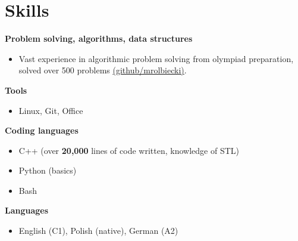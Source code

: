 \renewcommand{\subsection}[1]{
    \noindent\textbf{#1}
}
\section{Skills}
\subsection{Problem solving, algorithms, data structures}{}{}
\begin{itemize}
    \item Vast experience in algorithmic problem solving from olympiad preparation, solved over 500 problems \href{https://github.com/mrolbiecki/}{(github/mrolbiecki)}.

\end{itemize}

\subsection{Tools}{}{}
\begin{itemize}
    \item Linux, Git, Office
\end{itemize}

\subsection{Coding languages}{}{}
\begin{itemize}
    \item C++ (over \textbf{20,000} lines of code written, knowledge of STL)
    \item Python (basics)
    \item Bash
\end{itemize}

\subsection{Languages}{}{}
\begin{itemize}
    \item English (C1), Polish (native), German (A2)
\end{itemize}
